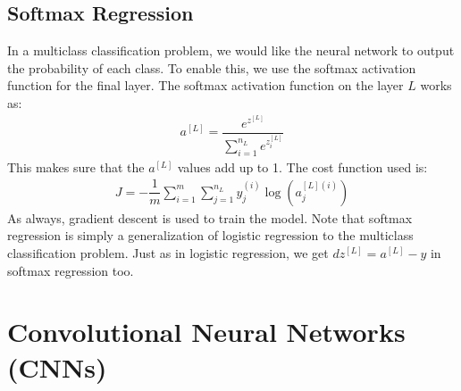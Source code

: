 \documentclass[a4paper, 12pt]{report}
\begin{document}
\section{Softmax Regression}
In a multiclass classification problem, we would like the neural network to output the probability of each class. To enable this, we use the softmax activation function for the final layer. The softmax activation function on the layer $L$ works as:
\begin{align*}
a^{[L]} = \dfrac{e^{z^{[L]}}}{\sum_{i=1}^{n_L}e^{z^{[L]}_i}}
\end{align*}
This makes sure that the $a^{[L]}$ values add up to 1. The cost function used is:
\begin{align*}
J = -\dfrac{1}{m}\sum_{i=1}^{m}\sum_{j=1}^{n_L}y^{(i)}_j\log(a^{[L](i)}_j)
\end{align*}
As always, gradient descent is used to train the model. Note that softmax regression is simply a generalization of logistic regression to the multiclass classification problem. Just as in logistic regression, we get $dz^{[L]} = a^{[L]} - y$ in softmax regression too.


\chapter{Convolutional Neural Networks (CNNs)}
\end{document}
